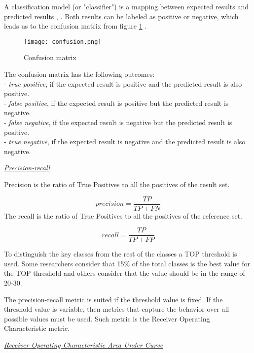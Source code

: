 A classification model (or "classifier") is a mapping between expected results and predicted results \cite{ROCIntro}, \cite{ROCBRADLEY19971145}. Both results can be labeled as positive or negative, which leads us to the confusion matrix from figure \ref{fig:confusion} \cite{b4}. 
\begin{figure}[h]
\centering
\texttt{[image: confusion.png]}
\caption{Confusion matrix}
\label{fig:confusion}
\centering
\end{figure}
The confusion matrix has the following outcomes:\\
- \textit{true positive}, if the expected result is positive and the predicted result is also positive.\\
- \textit{false positive}, if the expected result is positive but the predicted result is negative.\\
- \textit{false negative}, if the expected result is negative but the predicted result is positive.\\
- \textit{true negative}, if the expected result is negative and the predicted result is also negative.



\underline{\textit{Precision-recall}}


\hspace{-4em}Precision is the ratio of True Positives to all the positives of the result set.

\begin{equation}
 precision = \frac{TP}{TP+FN}
\end{equation}
The recall is the ratio of True Positives to all the positives of the reference set.

\begin{equation}
 recall = \frac{TP}{TP+FP}
\end{equation}

To distinguish the key classes from the rest of the classes a TOP threshold is used. Some researchers consider that 15\% of the total classes is the best value for the TOP threshold and others consider that the value should be in the range of 20-30. 

The precision-recall metric is suited if the threshold value is fixed. If the threshold value is variable, then metrics that capture the behavior over all possible values must be used. Such metric is the Receiver Operating Characteristic metric.

\underline{\textit{Receiver Operating Characteristic Area Under Curve}}


